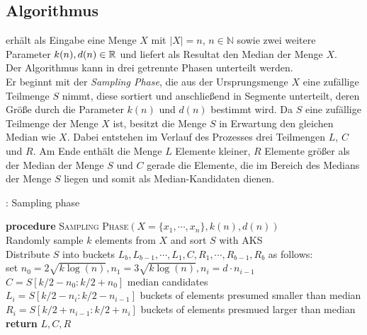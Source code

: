 \subsection{Algorithmus}	%
\RM erhält als Eingabe eine Menge $X$ mit $|X|=n$, $n\in\mathbb{N}$ sowie zwei weitere Parameter $k(n),d(n)\in\mathbb{R}$ und liefert als Resultat den Median der Menge $X$.\\[.2cm]
Der Algorithmus kann in drei getrennte Phasen unterteilt werden.\\
Er beginnt mit der \textit{Sampling Phase}, die aus der Ursprungsmenge $X$ eine zufällige Teilmenge $S$ nimmt, diese sortiert und anschließend in Segmente unterteilt, deren Größe durch die Parameter $k(n)$ und $d(n)$ bestimmt wird. Da $S$ eine zufällige Teilmenge der Menge $X$ ist, besitzt die Menge $S$ in Erwartung den gleichen Median wie $X$. Dabei entstehen im Verlauf des Prozesses drei Teilmengen $L$, $C$ und $R$. Am Ende enthält die Menge $L$ Elemente kleiner, $R$ Elemente größer als der Median der Menge $S$ und $C$ gerade die Elemente, die im Bereich des Medians der Menge $S$ liegen und somit als Median-Kandidaten dienen.\\[.2cm]

\label{algo: rmed_1}	%

\begin{algorithm}[H]
	\SetAlgoLined
	\caption{\RM : Sampling phase}
	\textbf{procedure} \textsc{Sampling Phase}$(X=\{x_1,\cdots,x_n\},k(n),d(n))$\\
		\hspace*{.5cm} Randomly sample $k$ elements from $X$ and sort $S$ with AKS\\
		\hspace*{.5cm} Distribute $S$ into buckets $L_b,L_{b-1},\cdots,L_1,C,R_1,\cdots,R_{b-1},R_b$ as follows:\\
			\hspace*{1cm} set $n_0=2\sqrt{k\log(n)},n_1=3\sqrt{k\log(n)},n_i=d\cdot n_{i-1}$\\
			\hspace*{1cm} $C=S[k/2-n_0:k/2+n_0]$ median candidates\\
			\hspace*{1cm} $L_i=S[k/2-n_i:k/2-n_{i-1}]$ buckets of elements presumed smaller than median\\
			\hspace*{1cm} $R_i=S[k/2+n_{i-1}:k/2+n_i]$ buckets of elements presmued larger than median\\
	\textbf{return} $L,C,R$
\end{algorithm}

